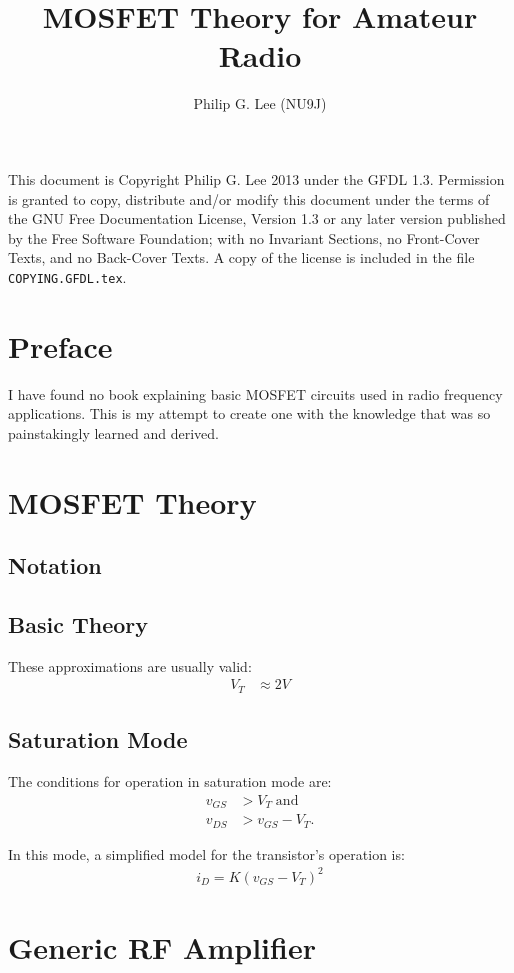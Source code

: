 \documentclass[letterpaper,10pt]{report}
\title{MOSFET Theory for Amateur Radio}
\author{Philip G. Lee (NU9J)}
\begin{document}
\maketitle

This document is Copyright Philip G. Lee 2013 under the GFDL 1.3.
Permission is granted to copy, distribute and/or modify this document
under the terms of the GNU Free Documentation License, Version 1.3 
or any later version published by the Free Software Foundation;
with no Invariant Sections, no Front-Cover Texts, and no Back-Cover Texts.
A copy of the license is included in the file \texttt{COPYING.GFDL.tex}.

\tableofcontents

\chapter*{Preface}%

I have found no book explaining basic MOSFET circuits used in radio frequency
applications. This is my attempt to create one with the knowledge that was so
painstakingly learned and derived.

\chapter{MOSFET Theory}%

\section{Notation}

\section{Basic Theory}

These approximations are usually valid:
\begin{align}
 V_T &\approx 2V
\end{align}

\section{Saturation Mode}

The conditions for operation in saturation mode are:
\begin{align}
 v_{GS} &> V_T \; \text{and}\\
 v_{DS} &> v_{GS} - V_T.
\end{align}

In this mode, a simplified model for the transistor's operation is:
\begin{align}
 i_D = K(v_{GS}-V_T)^2
\end{align}

\chapter{Generic RF Amplifier}%
\end{document}
